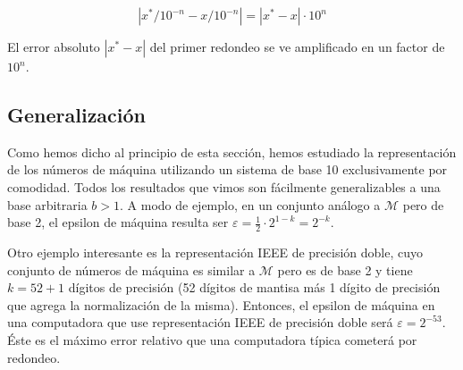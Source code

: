 \[|x^* / 10^{-n} - x / 10^{-n}| = |x^* - x| \cdot 10^{n}\]

El error absoluto $|x^* - x|$ del primer redondeo se ve amplificado en un factor de $10^n$.

\subsection{Generalización}

Como hemos dicho al principio de esta sección, hemos estudiado la representación de los números de máquina utilizando un sistema de base 10 exclusivamente por comodidad. Todos los resultados que vimos son fácilmente generalizables a una base arbitraria $b > 1$. A modo de ejemplo, en un conjunto análogo a $\mathcal{M}$ pero de base 2, el epsilon de máquina resulta ser $\varepsilon = \frac{1}{2} \cdot 2^{1 - k} = 2^{-k}$. 

Otro ejemplo interesante es la representación IEEE de precisión doble, cuyo conjunto de números de máquina es similar a $\mathcal{M}$ pero es de base 2 y tiene $k = 52 + 1$ dígitos de precisión (52 dígitos de mantisa más 1 dígito de precisión que agrega la normalización de la misma). Entonces, el epsilon de máquina en una computadora que use representación IEEE de precisión doble será $\varepsilon = 2^{-53}$. Éste es el máximo error relativo que una computadora típica cometerá por redondeo.